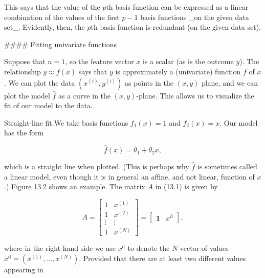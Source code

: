 This says that the value of the \(p\)th basis function can be expressed as a linear combination of the values of the first \(p-1\) basis functions _on the given data set_. Evidently, then, the \(p\)th basis function is redundant (on the given data set).

#### Fitting univariate functions

Suppose that \(n=1\), so the feature vector \(x\) is a scalar (as is the outcome \(y\)). The relationship \(y\approx f(x)\) says that \(y\) is approximately a (univariate) function \(f\) of \(x\). We can plot the data \((x^{(i)},y^{(i)})\) as points in the \((x,y)\) plane, and we can plot the model \(\hat{f}\) as a curve in the \((x,y)\)-plane. This allows us to visualize the fit of our model to the data.

Straight-line fit.We take basis functions \(f_{1}(x)=1\) and \(f_{2}(x)=x\). Our model has the form

\[\hat{f}(x)=\theta_{1}+\theta_{2}x,\]

which is a straight line when plotted. (This is perhaps why \(\hat{f}\) is sometimes called a linear model, even though it is in general an affine, and not linear, function of \(x\).) Figure 13.2 shows an example. The matrix \(A\) in (13.1) is given by

\[A=\left[\begin{array}{cc}1&x^{(1)}\\ 1&x^{(2)}\\ \vdots&\vdots\\ 1&x^{(N)}\end{array}\right]=\left[\begin{array}{cc}\mathbf{1}&x^{\mathrm{d} }\end{array}\right],\]

where in the right-hand side we use \(x^{\mathrm{d}}\) to denote the \(N\)-vector of values \(x^{\mathrm{d}}=(x^{(1)},\ldots,x^{(N)})\). Provided that there are at least two different values appearing in 